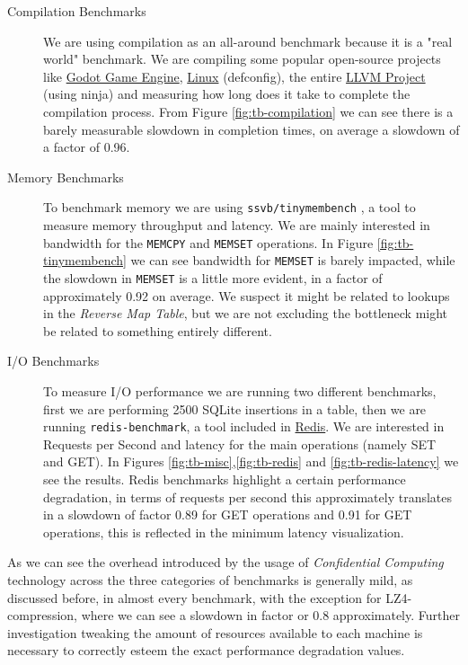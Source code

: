 \documentclass[twocolumn]{article}
\begin{document}
\begin{description}
    \item[Compilation Benchmarks] We are using compilation as an all-around benchmark because it is a "real world" benchmark. We are compiling some popular open-source projects like \href{https://github.com/godotengine/godot}{Godot Game Engine}, \href{https://git.kernel.org/pub/scm/linux/kernel/git/torvalds/linux.git}{Linux} (defconfig), the entire \href{https://github.com/llvm/llvm-project}{LLVM Project} (using ninja) and measuring how long does it take to complete the compilation process. From Figure \ref{fig:tb-compilation} we can see there is a barely measurable slowdown in completion times, on average a slowdown of a factor of 0.96.
    \item[Memory Benchmarks] To benchmark memory we are using \texttt{ssvb/tinymembench} \cite{tinymembench}, a tool to measure memory throughput and latency. We are mainly interested in bandwidth for the \texttt{MEMCPY} and \texttt{MEMSET} operations. In Figure \ref{fig:tb-tinymembench} we can see bandwidth for \texttt{MEMSET} is barely impacted, while the slowdown in \texttt{MEMSET} is a little more evident, in a factor of approximately 0.92 on average. We suspect it might be related to lookups in the \textit{Reverse Map Table}, but we are not excluding the bottleneck might be related to something entirely different.
    \item[I/O Benchmarks] To measure I/O performance we are running two different benchmarks, first we are performing 2500 SQLite insertions in a table, then we are running \texttt{redis-benchmark}, a tool included in \href{https://redis.io/}{Redis}. We are interested in Requests per Second and latency for the main operations (namely SET and GET). In Figures \ref{fig:tb-misc},\ref{fig:tb-redis} and \ref{fig:tb-redis-latency} we see the results. Redis benchmarks highlight a certain performance degradation, in terms of requests per second this approximately translates in a slowdown of factor 0.89 for GET operations and 0.91 for GET operations, this is reflected in the minimum latency visualization. 
\end{description}

As we can see the overhead introduced by the usage of \textit{Confidential Computing} technology across the three categories of benchmarks is generally mild, as discussed before, in almost every benchmark, with the exception for LZ4-compression, where we can see a slowdown in factor or 0.8 approximately. Further investigation tweaking the amount of resources available to each machine is necessary to correctly esteem the exact performance degradation values.
\end{document}
